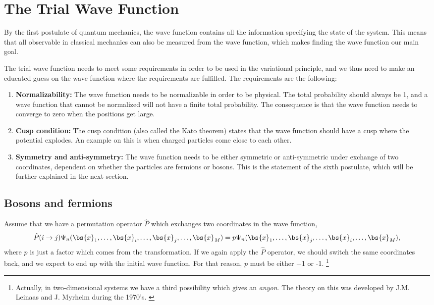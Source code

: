 \section{The Trial Wave Function} \label{subsec:wavefunction}
By the first postulate of quantum mechanics, the wave function contains all the information specifying the state of the system. This means that all observable in classical mechanics can also be measured from the wave function, which makes finding the wave function our main goal.

The trial wave function needs to meet some requirements in order to be used in the variational principle, and we thus need to make an educated guess on the wave function where the requirements are fulfilled. The requirements are the following:

\begin{enumerate}
	\item \textbf{Normalizability:} The wave function needs to be normalizable in order to be physical. The total probability should always be 1, and a wave function that cannot be normalized will not have a finite total probability. The consequence is that the wave function needs to converge to zero when the positions get large. 
	
	\item \textbf{Cusp condition:} The cusp condition (also called the Kato theorem) states that the wave function should have a cusp where the potential explodes. An example on this is when charged particles come close to each other. 
	
	\item \textbf{Symmetry and anti-symmetry:} The wave function needs to be either symmetric or anti-symmetric under exchange of two coordinates, dependent on whether the particles are fermions or bosons. This is the statement of the sixth postulate, which will be further explained in the next section.
\end{enumerate}

\subsection{Bosons and fermions} \label{subsubsec:symmetry}
Assume that we have a permutation operator $\hat{P}$ which exchanges two coordinates in the wave function,
\begin{equation}
\hat{P}(i\rightarrow j)\Psi_n(\bs{x}_1,\hdots,\bs{x}_i,\hdots,\bs{x}_j,\hdots,\bs{x}_M)=p\Psi_n(\bs{x}_1,\hdots,\bs{x}_j,\hdots,\bs{x}_i,\hdots,\bs{x}_M),
\end{equation}
where $p$ is just a factor which comes from the transformation. If we again apply the $\hat{P}$ operator, we should switch the same coordinates back, and we expect to end up with the initial wave function. For that reason, $p$ must be either +1 or -1. \footnote{Actually, in two-dimensional systems we have a third possibility which gives an \textit{anyon}. The theory on this was developed by J.M. Leinaas and J. Myrheim during the 1970's. \cite{leinaas_one_1977}}

